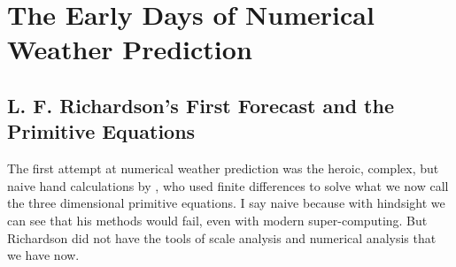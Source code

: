 \section{The Early Days of Numerical Weather Prediction}

\subsection{L. F. Richardson's First Forecast and the Primitive Equations }

The first attempt at numerical weather prediction was the heroic,
complex, but naive hand calculations by \citet{Rich22}, who used
finite differences to solve what we now call the three dimensional
primitive equations. I say naive because with hindsight we can see
that his methods would fail, even with modern super-computing. But
Richardson did not have the tools of scale analysis and numerical
analysis that we have now.

